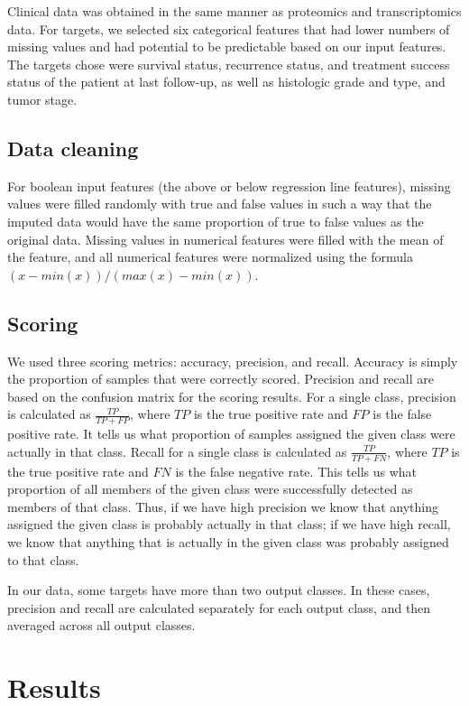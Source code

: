\documentclass{article}
\begin{document}
Clinical data was obtained in the same manner as proteomics and transcriptomics data. For targets, we selected six categorical features that had lower numbers of missing values and had potential to be predictable based on our input features. The targets chose were survival status, recurrence status, and treatment success status of the patient at last follow-up, as well as histologic grade and type, and tumor stage.

\subsection{Data cleaning}

For boolean input features (the above or below regression line features), missing values were filled randomly with true and false values in such a way that the imputed data would have the same proportion of true to false values as the original data. Missing values in numerical features were filled with the mean of the feature, and all numerical features were normalized using the formula $(x - min(x)) / (max(x) - min(x))$.

\subsection{Scoring}

We used three scoring metrics: accuracy, precision, and recall. Accuracy is simply the proportion of samples that were correctly scored. Precision and recall are based on the confusion matrix for the scoring results. For a single class, precision is calculated as $\frac{TP}{TP + FP}$, where $TP$ is the true positive rate and $FP$ is the false positive rate. It tells us what proportion of samples assigned the given class were actually in that class. Recall for a single class is calculated as $\frac{TP}{TP + FN}$, where $TP$ is the true positive rate and $FN$ is the false negative rate. This tells us what proportion of all members of the given class were successfully detected as members of that class. Thus, if we have high precision we know that anything assigned the given class is probably actually in that class; if we have high recall, we know that anything that is actually in the given class was probably assigned to that class.

In our data, some targets have more than two output classes. In these cases, precision and recall are calculated separately for each output class, and then averaged across all output classes.

\section{Results}
\end{document}
